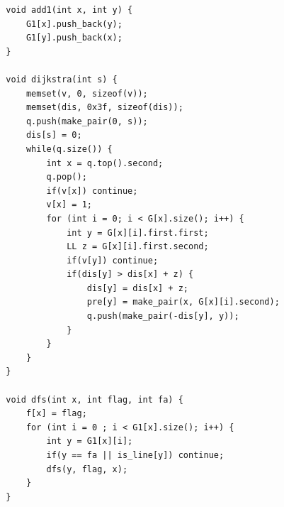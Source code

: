 \documentclass[UTF8,a4paper]{article}
\begin{document}
\begin{lstlisting}
        void add1(int x, int y) {
            G1[x].push_back(y);
            G1[y].push_back(x);
        }
         
        void dijkstra(int s) {
            memset(v, 0, sizeof(v));
            memset(dis, 0x3f, sizeof(dis));
            q.push(make_pair(0, s));
            dis[s] = 0;
            while(q.size()) {
                int x = q.top().second;
                q.pop();
                if(v[x]) continue;
                v[x] = 1;
                for (int i = 0; i < G[x].size(); i++) {
                    int y = G[x][i].first.first;
                    LL z = G[x][i].first.second;
                    if(v[y]) continue;
                    if(dis[y] > dis[x] + z) {
                        dis[y] = dis[x] + z;
                        pre[y] = make_pair(x, G[x][i].second);
                        q.push(make_pair(-dis[y], y));
                    }
                }
            }
        }
         
        void dfs(int x, int flag, int fa) {
            f[x] = flag;
            for (int i = 0 ; i < G1[x].size(); i++) {
                int y = G1[x][i];
                if(y == fa || is_line[y]) continue;
                dfs(y, flag, x);
            }
        }
         

\end{lstlisting}
\end{document}
